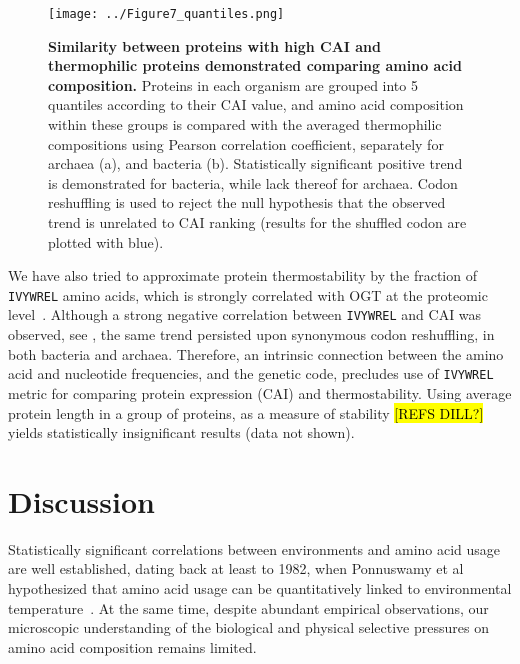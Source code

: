 \documentclass[10pt,letterpaper]{article}
\begin{document}
\begin{figure}[h!]
\texttt{[image: ../Figure7\_quantiles.png]}
\caption{
{\bf Similarity between proteins with high CAI and thermophilic proteins demonstrated comparing amino acid composition.}
Proteins in each organism are grouped into 5 quantiles according to their CAI value, and amino acid composition within these groups is compared with the averaged thermophilic compositions using Pearson correlation coefficient, separately for archaea (a), and bacteria (b). Statistically significant positive trend is demonstrated for bacteria, while lack thereof for archaea. Codon reshuffling is used to reject the null hypothesis that the observed trend is unrelated to CAI ranking (results for the shuffled codon are plotted with blue).
}
\label{fig:fig7}
\end{figure}


We have also tried to approximate protein thermostability by the fraction of \texttt{IVYWREL} amino acids, which is strongly correlated with OGT at the proteomic level~\cite{Zeldovich2007Protein}. Although a strong negative correlation between \texttt{IVYWREL} and CAI was observed, see , the same trend persisted upon synonymous codon reshuffling, in both bacteria and archaea. Therefore, an intrinsic connection between the amino acid and nucleotide frequencies, and the genetic code, precludes use of \texttt{IVYWREL} metric for comparing protein expression (CAI) and thermostability. Using average protein length in a group of proteins, as a measure of stability \hl{[REFS DILL?]} yields statistically insignificant results (data not shown).



\section*{Discussion}

Statistically significant correlations between environments and amino acid usage are well established, dating back at least to 1982, when Ponnuswamy et al hypothesized that amino acid usage can be quantitatively linked to environmental temperature~\cite{Ponnuswamy1986Amino}. At the same time, despite abundant empirical observations, our microscopic understanding of the biological and physical selective pressures on amino acid composition remains limited.
\end{document}
